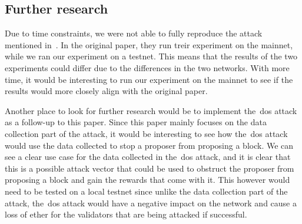 \subsection{Further research}\label{subsec:further-research}
Due to time constraints, we were not able to fully reproduce the attack mentioned in~\cite{heimbach2024deanonymizingethereumvalidatorsp2p}.
In the original paper, they run treir experiment on the mainnet, while we ran our experiment on a testnet.
This means that the results of the two experiments could differ due to the differences in the two networks.
With more time, it would be interesting to run our experiment on the mainnet to see if the results would more closely align with the original paper.


Another place to look for further research would be to implement the~\gls{dos} attack as a follow-up to this paper.
Since this paper mainly focuses on the data collection part of the attack, it would be interesting to see how the~\gls{dos} attack would use the data collected to stop a proposer from proposing a block.
We can see a clear use case for the data collected in the~\gls{dos} attack, and it is clear that this is a possible attack vector that could be used to obstruct the proposer from proposing a block and gain the rewards that come with it.
This however would need to be tested on a local testnet since unlike the data collection part of the attack, the~\gls{dos} attack would have a negative impact on the network and cause a loss of ether for the validators that are being attacked if successful.